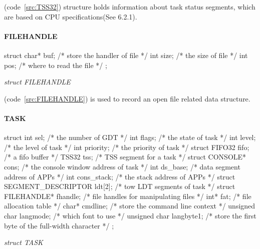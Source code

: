 \documentclass{swfcthesis}
\begin{document}
(code~\ref{src:TSS32}) structure holds information about task status segments, which are
based on CPU specifications(See 6.2.1\cite{intel_3a}).


\paragraph{FILEHANDLE}

\begin{listing}[H]
  \begin{codeblock}
\begin{ccode}
struct 
{ 
  char* buf; /* store the handler of file */
  int size;  /* the size of file */
  int pos;   /* where to read the file */
};
\end{ccode}
  \end{codeblock}
  \caption{\emph{struct FILEHANDLE}}\label{src:FILEHANDLE}
\end{listing}

(code~\ref{src:FILEHANDLE}) is used to record an open file related data structure.



\paragraph{TASK}

\begin{listing}[H]
  \begin{codeblock}
\begin{ccode}
struct 
{ 
  int sel;                          /* the number of GDT */
  int flags;                        /* the state of task */
  int level;                        /* the level of task */
  int priority;                     /* the priority of task */
  struct FIFO32 fifo;               /* a fifo buffer */
  TSS32 tss;                        /* TSS segment for a task */
  struct CONSOLE* cons;             /* the console window address of task */
  int ds_base;                      /* data segment address of APPs */
  int cons_stack;                   /* the stack address of APPs */
  struct SEGMENT_DESCRIPTOR ldt[2]; /* tow LDT segments of task */
  struct FILEHANDLE* fhandle;       /* file handles for manipulating files */
  int* fat;                         /* file allocation table */
  char* cmdline;                    /* store the command line context */
  unsigned char langmode;           /* which font to use */
  unsigned char langbyte1;          /* store the first byte of the full-width character */
};
\end{ccode}
  \end{codeblock}
  \caption{\emph{struct TASK}}\label{src:TASK}
\end{listing}
\end{document}
